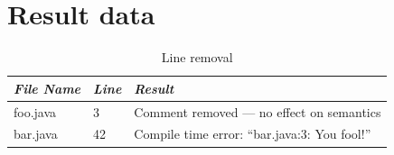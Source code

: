 \documentclass[10pt]{report}
\begin{document}


%
%

\appendix
\chapter{Result data}

\begin{table}[h]
  \begin{tabular}{ | p{3cm} | p{1cm} | p{8cm} | }
  \hline

  {\em File Name}
  	& {\em Line} 
	& {\em Result}
	\\ \hline
  \hline

  foo.java
      & 3
      & Comment removed --- no effect on semantics
      \\ \hline
  bar.java
      & 42
      & Compile time error: ``bar.java:3: You fool!''
      \\ \hline

  \end{tabular}
  \caption{Line removal}
  \label{remove-line-data}
\end{table} 
\end{document}

